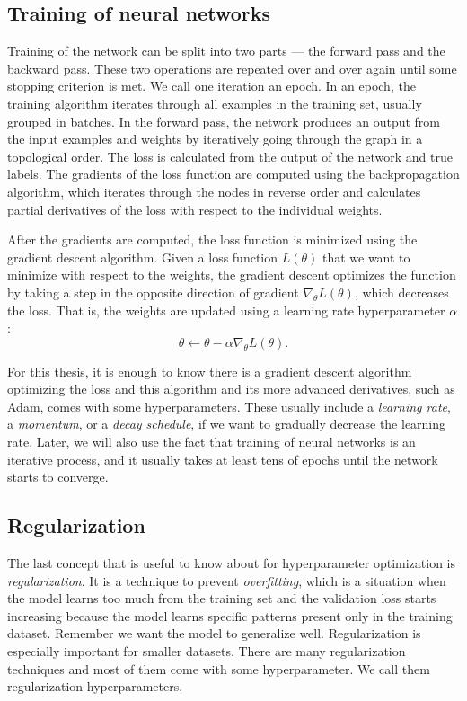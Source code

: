 \subsection{Training of neural networks}
Training of the network can be split into two parts --- the forward pass and the backward pass. These two operations are repeated over and over again until some stopping criterion is met. We call one iteration an epoch. In an epoch, the training algorithm iterates through all examples in the training set, usually grouped in batches. In the forward pass, the network produces an output from the input examples and weights by iteratively going through the graph in a topological order. The loss is calculated from the output of the network and true labels. The gradients of the loss function are computed using the backpropagation algorithm, which iterates through the nodes in reverse order and calculates partial derivatives of the loss with respect to the individual weights.

After the gradients are computed, the loss function is minimized using the gradient descent algorithm. Given a loss function $L(\theta)$ that we want to minimize with respect to the weights, the gradient descent optimizes the function by taking a step in the opposite direction of gradient $\nabla_\theta L(\theta)$, which decreases the loss. That is, the weights are updated using a learning rate hyperparameter $\alpha$: $$ \theta \leftarrow \theta - \alpha \nabla_\theta L(\theta).$$

For this thesis, it is enough to know there is a gradient descent algorithm optimizing the loss and this algorithm and its more advanced derivatives, such as Adam, comes with some hyperparameters. These usually include a \textit{learning rate}, a \textit{momentum}, or a \textit{decay schedule}, if we want to gradually decrease the learning rate. Later, we will also use the fact that training of neural networks is an iterative process, and it usually takes at least tens of epochs until the network starts to converge.

\subsection{Regularization}
The last concept that is useful to know about for hyperparameter optimization is \textit{regularization}. It is a technique to prevent \textit{overfitting}, which is a situation when the model learns too much from the training set and the validation loss starts increasing because the model learns specific patterns present only in the training dataset. Remember we want the model to generalize well. Regularization is especially important for smaller datasets. There are many regularization techniques and most of them come with some hyperparameter. We call them regularization hyperparameters.

